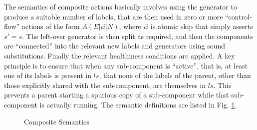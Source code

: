 The semantics of composite actions basically involves using the generator
to produce a suitable number of labels,
that are then used in zero or more ``control-flow'' actions
of the form $A(E|ii|N)$, where $ii$ is atomic skip that simply asserts $s'=s$.
The left-over generator is then split as required,
and then the components are ``connected'' into
the relevant new labels and generators using sound substitutions.
Finally the relevant healthiness conditions are applied.
A key principle is to ensure that when any sub-component is ``active'',
that is, at least one of its labels is present in $ls$,
that none of the labels of the parent,
other than those explicitly shared with the sub-component,
are themselves in $ls$.
This prevents a parent starting a spurious copy of a sub-component
while that sub-component is actually running.
The semantic definitions are listed in Fig. \ref{fig:composite-semantics}.
\begin{figure}[t]
  \caption{Composite Semantics}
  \label{fig:composite-semantics}
\end{figure}

